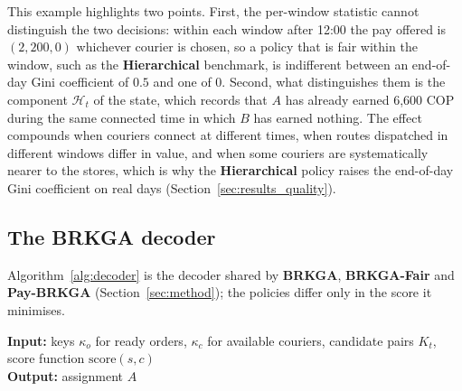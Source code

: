 \documentclass[a4paper,11pt,review,3p,authoryear]{elsarticle}
\DeclareMathOperator*{\argmin}{arg\,min}
\newcommand{\Hist}{\mathcal{H}}
\begin{document}
This example highlights two points. First, the per-window statistic cannot distinguish the two decisions: within each window after 12:00 the pay offered is $(2{,}200, 0)$ whichever courier is chosen, so a policy that is fair within the window, such as the \textbf{Hierarchical} benchmark, is indifferent between an end-of-day Gini coefficient of $0.5$ and one of $0$. Second, what distinguishes them is the component $\Hist_t$ of the state, which records that $A$ has already earned 6{,}600 COP during the same connected time in which $B$ has earned nothing. The effect compounds when couriers connect at different times, when routes dispatched in different windows differ in value, and when some couriers are systematically nearer to the stores, which is why the \textbf{Hierarchical} policy raises the end-of-day Gini coefficient on real days (Section~\ref{sec:results_quality}).

\subsection{The BRKGA decoder}
\label{sec:App_decoder}

Algorithm~\ref{alg:decoder} is the decoder shared by \textbf{BRKGA}, \textbf{BRKGA-Fair} and \textbf{Pay-BRKGA} (Section~\ref{sec:method}); the policies differ only in the score it minimises.

\begin{algorithm}[htbp]
\textbf{Input:} keys $\kappa_o$ for ready orders, $\kappa_c$ for available couriers, candidate pairs $K_t$, score function $\text{score}(s, c)$\\
\textbf{Output:} assignment $A$
\begin{algorithmic}[1]
      \STATE{$(s^*, c^*) \gets \argmin \{\text{score}(s, c) : s \in \mathcal{S}_o,\ c \in \mathcal{C}_o,\ (c,s) \in K_t\}$}
    \ENDIF
  \ENDFOR
\ENDFOR
{}
\end{algorithmic}
\caption{BRKGA decoder shared by \textbf{BRKGA}, \textbf{BRKGA-Fair} and \textbf{Pay-BRKGA}}
\label{alg:decoder}
\end{algorithm}
\end{document}
